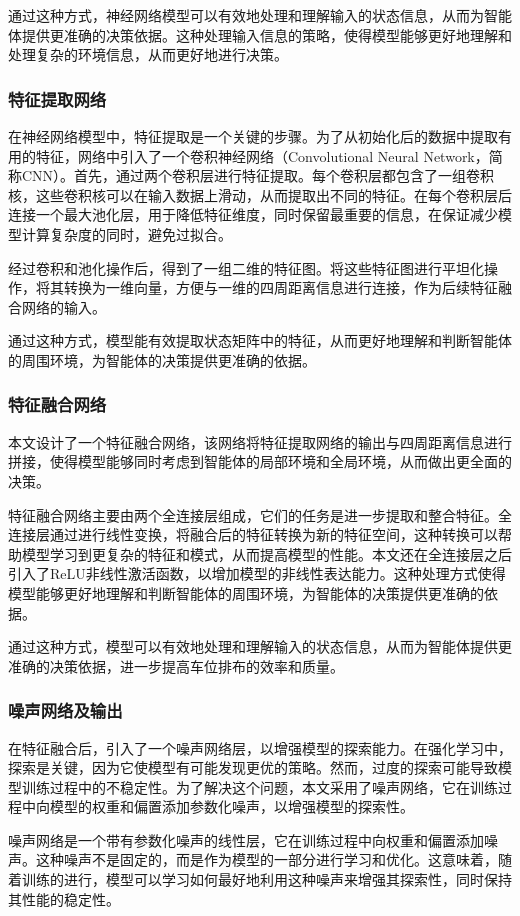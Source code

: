 通过这种方式，神经网络模型可以有效地处理和理解输入的状态信息，从而为智能体提供更准确的决策依据。这种处理输入信息的策略，使得模型能够更好地理解和处理复杂的环境信息，从而更好地进行决策。
\subsubsection{特征提取网络}
在神经网络模型中，特征提取是一个关键的步骤。为了从初始化后的数据中提取有用的特征，网络中引入了一个卷积神经网络（Convolutional Neural Network，简称CNN）。首先，通过两个卷积层进行特征提取。每个卷积层都包含了一组卷积核，这些卷积核可以在输入数据上滑动，从而提取出不同的特征。在每个卷积层后连接一个最大池化层，用于降低特征维度，同时保留最重要的信息，在保证减少模型计算复杂度的同时，避免过拟合。

经过卷积和池化操作后，得到了一组二维的特征图。将这些特征图进行平坦化操作，将其转换为一维向量，方便与一维的四周距离信息进行连接，作为后续特征融合网络的输入。

通过这种方式，模型能有效提取状态矩阵中的特征，从而更好地理解和判断智能体的周围环境，为智能体的决策提供更准确的依据。
\subsubsection{特征融合网络}
本文设计了一个特征融合网络，该网络将特征提取网络的输出与四周距离信息进行拼接，使得模型能够同时考虑到智能体的局部环境和全局环境，从而做出更全面的决策。

特征融合网络主要由两个全连接层组成，它们的任务是进一步提取和整合特征。全连接层通过进行线性变换，将融合后的特征转换为新的特征空间，这种转换可以帮助模型学习到更复杂的特征和模式，从而提高模型的性能。本文还在全连接层之后引入了ReLU非线性激活函数，以增加模型的非线性表达能力。这种处理方式使得模型能够更好地理解和判断智能体的周围环境，为智能体的决策提供更准确的依据。

通过这种方式，模型可以有效地处理和理解输入的状态信息，从而为智能体提供更准确的决策依据，进一步提高车位排布的效率和质量。
\subsubsection{噪声网络及输出}
在特征融合后，引入了一个噪声网络层，以增强模型的探索能力。在强化学习中，探索是关键，因为它使模型有可能发现更优的策略。然而，过度的探索可能导致模型训练过程中的不稳定性。为了解决这个问题，本文采用了噪声网络，它在训练过程中向模型的权重和偏置添加参数化噪声，以增强模型的探索性。

噪声网络是一个带有参数化噪声的线性层，它在训练过程中向权重和偏置添加噪声。这种噪声不是固定的，而是作为模型的一部分进行学习和优化。这意味着，随着训练的进行，模型可以学习如何最好地利用这种噪声来增强其探索性，同时保持其性能的稳定性。

